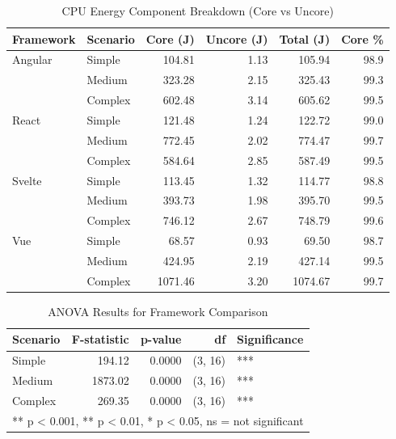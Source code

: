 \begin{table}[htbp]
\centering
\caption{CPU Energy Component Breakdown (Core vs Uncore)}
\label{tab:component_breakdown}
\begin{tabular}{llrrrr}
\toprule
\textbf{Framework} & \textbf{Scenario} & \textbf{Core (J)} & \textbf{Uncore (J)} & \textbf{Total (J)} & \textbf{Core \%} \\
\midrule
Angular    & Simple   &  104.81 &    1.13 &  105.94 &  98.9 \\
           & Medium   &  323.28 &    2.15 &  325.43 &  99.3 \\
           & Complex  &  602.48 &    3.14 &  605.62 &  99.5 \\
\midrule
React      & Simple   &  121.48 &    1.24 &  122.72 &  99.0 \\
           & Medium   &  772.45 &    2.02 &  774.47 &  99.7 \\
           & Complex  &  584.64 &    2.85 &  587.49 &  99.5 \\
\midrule
Svelte     & Simple   &  113.45 &    1.32 &  114.77 &  98.8 \\
           & Medium   &  393.73 &    1.98 &  395.70 &  99.5 \\
           & Complex  &  746.12 &    2.67 &  748.79 &  99.6 \\
\midrule
Vue        & Simple   &   68.57 &    0.93 &   69.50 &  98.7 \\
           & Medium   &  424.95 &    2.19 &  427.14 &  99.5 \\
           & Complex  & 1071.46 &    3.20 & 1074.67 &  99.7 \\
\bottomrule
\end{tabular}
\end{table}


\begin{table}[htbp]
\centering
\caption{ANOVA Results for Framework Comparison}
\label{tab:anova}
\begin{tabular}{lrrrl}
\toprule
\textbf{Scenario} & \textbf{F-statistic} & \textbf{p-value} & \textbf{df} & \textbf{Significance} \\
\midrule
Simple   &   194.12 & 0.0000 & (3, 16) & *** \\
Medium   &  1873.02 & 0.0000 & (3, 16) & *** \\
Complex  &   269.35 & 0.0000 & (3, 16) & *** \\
\bottomrule
\multicolumn{5}{l}{\footnotesize *** p < 0.001, ** p < 0.01, * p < 0.05, ns = not significant} \\
\end{tabular}
\end{table}


